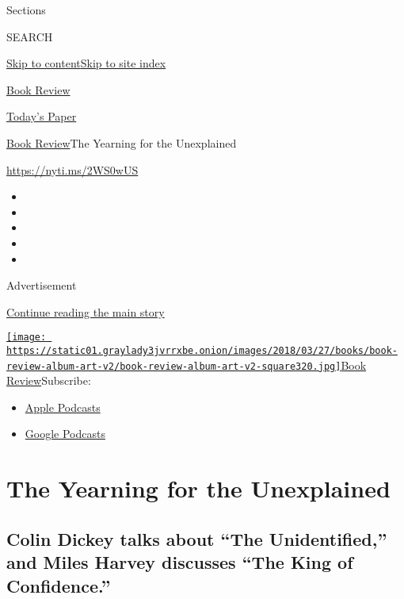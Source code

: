 Sections

SEARCH

\protect\hyperlink{site-content}{Skip to
content}\protect\hyperlink{site-index}{Skip to site index}

\href{https://www.nytimes3xbfgragh.onion/section/books/review}{Book
Review}

\href{https://myaccount.nytimes3xbfgragh.onion/auth/login?response_type=cookie\&client_id=vi}{}

\href{https://www.nytimes3xbfgragh.onion/section/todayspaper}{Today's
Paper}

\href{/section/books/review}{Book Review}\textbar{}The Yearning for the
Unexplained

\url{https://nyti.ms/2WS0wUS}

\begin{itemize}
\item
\item
\item
\item
\item
\end{itemize}

Advertisement

\protect\hyperlink{after-top}{Continue reading the main story}

\href{https://www.nytimes3xbfgragh.onion/column/book-review-podcast}{\texttt{[image: https://static01.graylady3jvrrxbe.onion/images/2018/03/27/books/book-review-album-art-v2/book-review-album-art-v2-square320.jpg]}Book
Review}Subscribe:

\begin{itemize}
\tightlist
\item
  \href{https://itunes.apple.com/us/podcast/id120315179}{Apple Podcasts}
\item
  \href{https://www.google.com/podcasts?feed=aHR0cHM6Ly9yc3MuYXJ0MTkuY29tL2Jvb2stcmV2aWV3}{Google
  Podcasts}
\end{itemize}

\hypertarget{the-yearning-for-the-unexplained}{%
\section{The Yearning for the
Unexplained}\label{the-yearning-for-the-unexplained}}

\hypertarget{colin-dickey-talks-about-the-unidentified-and-miles-harvey-discusses-the-king-of-confidence}{%
\subsection{Colin Dickey talks about ``The Unidentified,'' and Miles
Harvey discusses ``The King of
Confidence.''}\label{colin-dickey-talks-about-the-unidentified-and-miles-harvey-discusses-the-king-of-confidence}}

